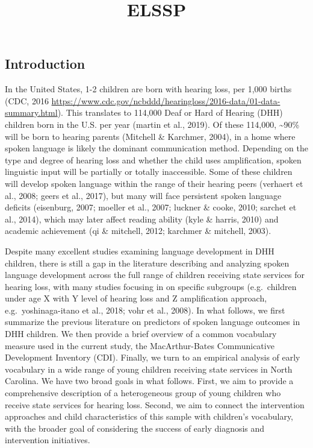 \documentclass[
]{article}
\title{ELSSP}
\author{}
\date{\vspace{-2.5em}}
\begin{document}
\maketitle

\hypertarget{introduction}{%
\subsection{Introduction}\label{introduction}}

In the United States, 1-2 children are born with hearing loss, per 1,000
births (CDC, 2016
\url{https://www.cdc.gov/ncbddd/hearingloss/2016-data/01-data-summary.html}).
This translates to 114,000 Deaf or Hard of Hearing (DHH) children born
in the U.S. per year (martin et al., 2019). Of these 114,000,
\textasciitilde90\% will be born to hearing parents (Mitchell \&
Karchmer, 2004), in a home where spoken language is likely the dominant
communication method. Depending on the type and degree of hearing loss
and whether the child uses amplification, spoken linguistic input will
be partially or totally inaccessible. Some of these children will
develop spoken language within the range of their hearing peers
(verhaert et al., 2008; geers et al., 2017), but many will face
persistent spoken language deficits (eisenburg, 2007; moeller et al.,
2007; luckner \& cooke, 2010; sarchet et al., 2014), which may later
affect reading ability (kyle \& harris, 2010) and academic achievement
(qi \& mitchell, 2012; karchmer \& mitchell, 2003).

Despite many excellent studies examining language development in DHH
children, there is still a gap in the literature describing and
analyzing spoken language development across the full range of children
receiving state services for hearing loss, with many studies focusing in
on specific subgroups (e.g.~children under age X with Y level of hearing
loss and Z amplification approach, e.g.~yoshinaga-itano et al., 2018;
vohr et al., 2008). In what follows, we first summarize the previous
literature on predictors of spoken language outcomes in DHH children. We
then provide a brief overview of a common vocabulary measure used in the
current study, the MacArthur-Bates Communicative Development Inventory
(CDI). Finally, we turn to an empirical analysis of early vocabulary in
a wide range of young children receiving state services in North
Carolina. We have two broad goals in what follows. First, we aim to
provide a comprehensive description of a heterogeneous group of young
children who receive state services for hearing loss. Second, we aim to
connect the intervention approaches and child characteristics of this
sample with children's vocabulary, with the broader goal of considering
the success of early diagnosis and intervention initiatives.
\end{document}
